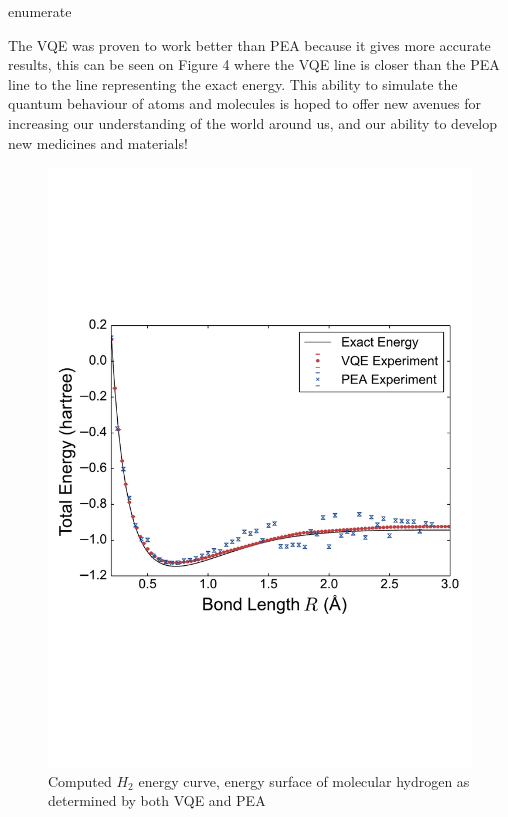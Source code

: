 enumerate\documentclass[14pt,landscape,color=UCLdarkred,margin=3cm]{uclposter}
\begin{document}
\begin{multicols}{3}
The VQE was proven to work better than PEA because it gives more accurate results, this can be seen on Figure 4 where the VQE line is closer than the PEA line to the line representing the exact energy. This ability to simulate the quantum behaviour of atoms and molecules is hoped to offer new avenues for increasing our understanding of the world around us, and our ability to develop new medicines and materials!

\begin{figure}[H]
  \begin{center}
  \includegraphics[scale=1.2]{result.pdf}
  \caption{Computed $H_2$ energy curve, energy surface of molecular hydrogen as determined by both VQE and PEA}
  \end{center}
    
 

   
\end{figure}



\end{multicols}
	
\end{document}
